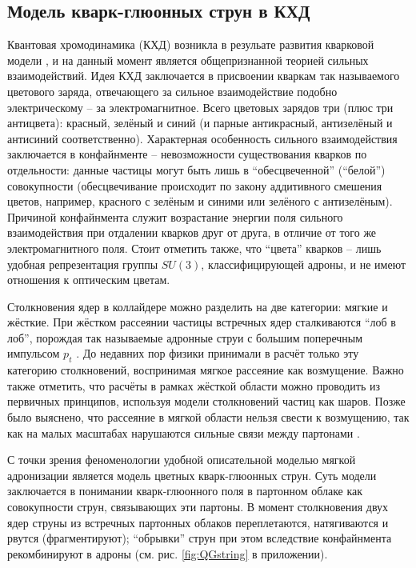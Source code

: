\subsection{Модель кварк-глюонных струн в КХД}
Квантовая хромодинамика (КХД) возникла в резульате развития кварковой модели \cite{YndurainQCD}, и на данный момент является общепризнанной теорией сильных взаимодействий. 
Идея КХД заключается в присвоении кваркам так называемого цветового заряда, отвечающего за сильное взаимодействие подобно электрическому -- за электромагнитное. 
Всего цветовых зарядов три (плюс три антицвета): красный, зелёный и синий (и парные антикрасный, антизелёный и антисиний соответственно). 
Характерная особенность сильного взаимодействия заключается в конфайнменте -- невозможности существования кварков по отдельности: данные частицы могут быть лишь в ``обесцвеченной'' (``белой'') совокупности (обесцвечивание происходит по закону аддитивного смешения цветов, например, красного с зелёным и синими или зелёного с антизелёным). 
Причиной конфайнмента служит возрастание энергии поля сильного взаимодействия при отдалении кварков друг от друга, в отличие от того же электромагнитного поля. 
Стоит отметить также, что ``цвета'' кварков -- лишь удобная репрезентация группы $SU(3)$, классифицирующей адроны, и не имеют отношения к оптическим цветам.

Столкновения ядер в коллайдере можно разделить на две категории: мягкие и жёсткие. 
При жёстком рассеянии частицы встречных ядер сталкиваются ``лоб в лоб'', порождая так называемые адронные струи с большим поперечным импульсом $p_t$ \cite{HadronJet}. 
До недавних пор физики принимали в расчёт только эту категорию столкновений, воспринимая мягкое рассеяние как возмущение. 
Важно также отметить, что расчёты в рамках жёсткой области можно проводить из первичных принципов, используя модели столкновений частиц как шаров. 
Позже было выяснено, что рассеяние в мягкой области нельзя свести к возмущению, так как на малых масштабах нарушаются сильные связи между партонами \cite{SoftQCD1,SoftQCD2}.

С точки зрения феноменологии удобной описательной моделью мягкой адронизации является модель цветных кварк-глюонных струн\cite{ColorStringsModel1,ColorStringsModel2,ColorStringsModel3,ColorStringsModel4}. 
Суть модели заключается в понимании кварк-глюонного поля в партонном облаке как совокупности струн, связывающих эти партоны. 
В момент столкновения двух ядер струны из встречных партонных облаков переплетаются, натягиваются и рвутся (фрагментируют); ``обрывки'' струн при этом вследствие конфайнмента рекомбинируют в адроны (см. рис. \ref{fig:QGstring} в приложении). 
